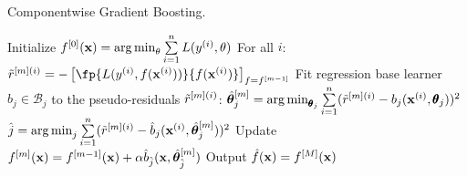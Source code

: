 
\begin{algorithm}[H]
  \begin{footnotesize}
  \begin{center}
  \caption{Componentwise Gradient Boosting.}
    \begin{algorithmic}[1]
      \State Initialize $f^{[0]}(\mathbf{x}) = \operatorname{arg\,min}_{\theta} \sum  \limits_{i=1}^n L(y^{(i)}, \theta)$
        \State For all $i$: $\rmi = -\left[\fp{L(\yi, f(\xi))}{f(\xi)}\right]_{f=\fmd}$
          \State Fit regression base learner $b_j \in \mathcal{B}_j$ to the pseudo-residuals $\tilde{r}^{[m](i)}$:
          \State $\hat{\bm{\theta}}^{[m]}_j = \operatorname{arg\,min}_{\pmb\theta_j} \sum  \limits_{i=1}^n 
          (\tilde{r}^{[m](i)} - b_j(\mathbf{x}^{(i)}, \pmb\theta_j))^2$
        \EndFor
        \State $\hat{j} = \operatorname{arg\,min}_{j} \sum  \limits_{i=1}^n (\tilde{r}^{[m](i)} - \hat{b}_j(\mathbf{x}^{(i)}, \hat{\bm{\theta}}^{[m]}_j))^2$
        \State Update $f^{[m]}(\mathbf{x}) = f^{[m-1]}(\mathbf{x}) + \alpha \hat{b}_{\hat{j}}(\mathbf{x}, \hat{\bm{\theta}}^{[m]}_{\hat{j}})$
      \EndFor
      \State Output $\hat{f}(\mathbf{x}) = f^{[M]}(\mathbf{x})$
    \end{algorithmic}
    \end{center}
    \end{footnotesize}
\end{algorithm}
